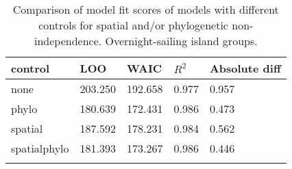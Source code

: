 \begin{longtable}{p{2cm}p{2cm}p{2cm}p{2cm}p{2cm}}
  \toprule
control & LOO & WAIC & $R^2$ & Absolute diff \\ 
  \midrule
none & 203.250 & 192.658 & 0.977 & 0.957 \\ 
  phylo & 180.639 & 172.431 & 0.986 & 0.473 \\ 
  spatial & 187.592 & 178.231 & 0.984 & 0.562 \\ 
  spatialphylo & 181.393 & 173.267 & 0.986 & 0.446 \\ 
   \bottomrule
\caption{Comparison of model fit scores of models with different controls for spatial and/or phylogenetic non-independence. Overnight-sailing island groups.} 
\label{model_fit_score_table_SBZR}
\end{longtable}

